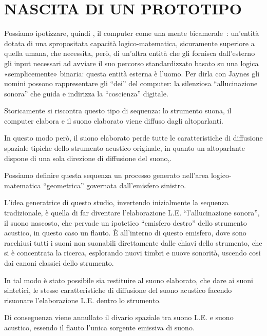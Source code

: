 
\chapter{NASCITA DI UN PROTOTIPO}
\label{chp:nascita}

Possiamo ipotizzare, quindi , il computer come una mente bicamerale : un’entità
dotata di una spropositata  capacità logico-matematica, sicuramente superiore a
quella umana, che necessita, però, di un’altra entità che gli fornisca
dall’esterno  gli input necessari ad avviare il suo percorso  standardizzato
basato su una logica  «semplicemente» binaria: questa entità esterna è l’uomo.
Per dirla con Jaynes gli uomini possono  rappresentare  gli “dei” del computer:
la silenziosa “allucinazione sonora”  che guida e indirizza la “coscienza” digitale.

Storicamente si riscontra questo tipo di sequenza: lo strumento suona, il
computer elabora e  il suono elaborato viene diffuso dagli altoparlanti.

In questo modo però, il suono elaborato perde tutte le caratteristiche di
diffusione spaziale tipiche dello strumento acustico originale, in quanto
un altoparlante dispone di una sola direzione di diffusione del suono,.

Possiamo definire questa sequenza  un processo generato  nell’area
logico-matematica “geometrica” governata dall’emisfero sinistro.

L’idea generatrice di questo studio, invertendo inizialmente la sequenza
tradizionale, è quella di far diventare l’elaborazione L.E. “l’allucinazione
sonora”, il suono nascosto, che pervade un ipotetico “emisfero destro” dello
strumento acustico, in questo caso un flauto. È all’interno di questo emisfero,
dove sono racchiusi tutti i suoni non suonabili direttamente dalle chiavi dello
strumento, che si è concentrata la ricerca, esplorando nuovi timbri e  nuove
sonorità, uscendo così dai canoni classici dello strumento.

In tal modo è stato possibile sia restituire al suono elaborato, che dare  ai
suoni sintetici, le stesse caratteristiche di diffusione del suono acustico
facendo risuonare l’elaborazione L.E. dentro lo strumento.

Di conseguenza  viene annullato il divario spaziale tra suono L.E. e suono
acustico, essendo il flauto l’unica sorgente emissiva di suono.

